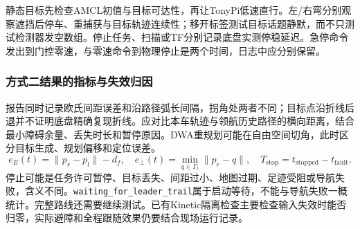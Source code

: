 静态目标先检查AMCL初值与目标可达性，再让TonyPi低速直行。左/右弯分别观察遮挡后停车、重捕获与目标轨迹连续性；移开标签测试目标话题静默，而不只测试检测器发空数组。停止任务、扫描或TF分别记录底盘实测停稳延迟。急停命令发出到门控零速，与零速命令到物理停止是两个时间，日志中应分别保留。

\subsubsection{方式二结果的指标与失效归因}
报告同时记录欧氏间距误差和沿路径弧长间隔，拐角处两者不同；目标点沿折线后退并不证明底盘精确复现折线。应对比本车轨迹与领航历史路径的横向距离，结合最小障碍余量、丢失时长和暂停原因。DWA重规划可能在自由空间切角，此时区分目标生成、规划偏移和定位误差。
\begin{equation}
e_E(t)=\|p_r-p_l\|-d_f,\quad e_\perp(t)=\min_{q\in\Gamma_l}\|p_r-q\|,\quad T_{\mathrm{stop}}=t_{\mathrm{stopped}}-t_{\mathrm{fault}}.
\end{equation}
停止可能是任务许可暂停、目标丢失、间距过小、地图过期、足迹受阻或导航失败，含义不同。\texttt{waiting\_\allowbreak for\_\allowbreak leader\_\allowbreak trail}属于启动等待，不能与导航失败一概统计。完整路线还需要继续测试。已有Kinetic隔离检查主要检查输入失效时能否归零，实际避障和全程跟随效果仍要结合现场运行记录。
